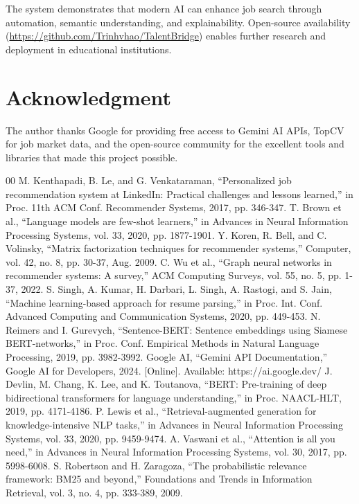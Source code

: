 \documentclass[conference]{IEEEtran}
\begin{document}
The system demonstrates that modern AI can enhance job search through automation, semantic understanding, and explainability. Open-source availability (\url{https://github.com/Trinhvhao/TalentBridge}) enables further research and deployment in educational institutions.

\section*{Acknowledgment}

The author thanks Google for providing free access to Gemini AI APIs, TopCV for job market data, and the open-source community for the excellent tools and libraries that made this project possible.

\begin{thebibliography}{00}
 M. Kenthapadi, B. Le, and G. Venkataraman, ``Personalized job recommendation system at LinkedIn: Practical challenges and lessons learned,'' in Proc. 11th ACM Conf. Recommender Systems, 2017, pp. 346-347.
 T. Brown et al., ``Language models are few-shot learners,'' in Advances in Neural Information Processing Systems, vol. 33, 2020, pp. 1877-1901.
 Y. Koren, R. Bell, and C. Volinsky, ``Matrix factorization techniques for recommender systems,'' Computer, vol. 42, no. 8, pp. 30-37, Aug. 2009.
 C. Wu et al., ``Graph neural networks in recommender systems: A survey,'' ACM Computing Surveys, vol. 55, no. 5, pp. 1-37, 2022.
 S. Singh, A. Kumar, H. Darbari, L. Singh, A. Rastogi, and S. Jain, ``Machine learning-based approach for resume parsing,'' in Proc. Int. Conf. Advanced Computing and Communication Systems, 2020, pp. 449-453.
 N. Reimers and I. Gurevych, ``Sentence-BERT: Sentence embeddings using Siamese BERT-networks,'' in Proc. Conf. Empirical Methods in Natural Language Processing, 2019, pp. 3982-3992.
 Google AI, ``Gemini API Documentation,'' Google AI for Developers, 2024. [Online]. Available: https://ai.google.dev/
 J. Devlin, M. Chang, K. Lee, and K. Toutanova, ``BERT: Pre-training of deep bidirectional transformers for language understanding,'' in Proc. NAACL-HLT, 2019, pp. 4171-4186.
 P. Lewis et al., ``Retrieval-augmented generation for knowledge-intensive NLP tasks,'' in Advances in Neural Information Processing Systems, vol. 33, 2020, pp. 9459-9474.
 A. Vaswani et al., ``Attention is all you need,'' in Advances in Neural Information Processing Systems, vol. 30, 2017, pp. 5998-6008.
 S. Robertson and H. Zaragoza, ``The probabilistic relevance framework: BM25 and beyond,'' Foundations and Trends in Information Retrieval, vol. 3, no. 4, pp. 333-389, 2009.

\end{thebibliography}
\end{document}
